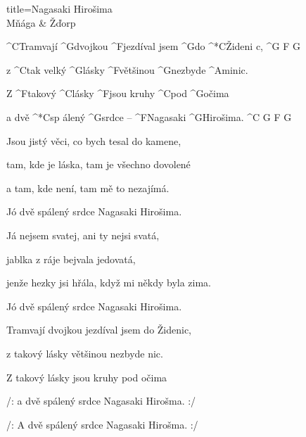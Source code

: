 \begin{song}{title=\predtitle\centering Nagasaki Hirošima \\\large Mňága \&  Žďorp  \vspace*{-0.3cm}}  %
\begin{centerjustified}
\nejnejvetsi

\sloka
	^{C\z }Tramvají ^{G\z }dvojkou ^{F\z }jezdíval jsem ^{G}do ^*{\z C}Žideni c, ^{G\,\,F\,\,G}

	z ^{C}tak velký ^{G\z }lásky ^{F\z}většinou ^{G\z }nezbyde ^{Ami\z }nic.~~~

	Z ^{F\z }takový ^{C\z}lásky ^{F\z}jsou kruhy ^{C\z}pod ^{\z G}očima

	a dvě ^*{C}sp álený ^{G\z }srdce -- ^{F\z }Nagasaki ^{G\z}Hirošima. ^{C\,\,G\,\,F\,\,G}

\sloka
	Jsou jistý věci, co bych tesal do kamene,
	
	tam, kde je láska, tam je všechno dovolené
	
	a tam, kde není, tam mě to nezajímá.
	
	Jó dvě spálený srdce Nagasaki Hirošima.

\sloka
	Já nejsem svatej, ani ty nejsi svatá,
	
	jablka z ráje bejvala jedovatá,
	
	jenže hezky jsi hřála, když mi někdy byla zima.
	
	Jó dvě spálený srdce Nagasaki Hirošima.

\sloka
	Tramvají dvojkou jezdíval jsem do Židenic,
	
	z takový lásky většinou nezbyde nic.
	
	Z takový lásky jsou kruhy pod očima

	/: a dvě spálený srdce Nagasaki Hirošma. :/
	
	/: A dvě spálený srdce Nagasaki Hirošma. :/

\end{centerjustified}
\setcounter{Slokočet}{0}
\end{song}


